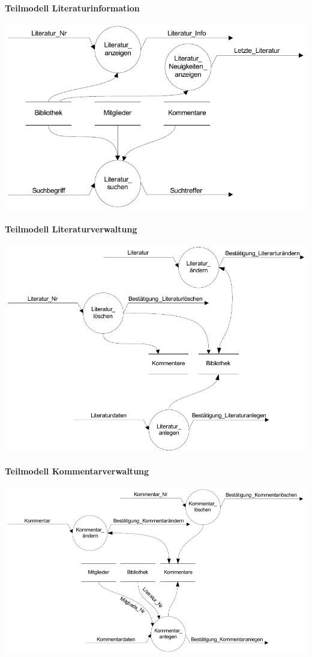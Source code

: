 \paragraph{Teilmodell Literaturinformation}
\includegraphics[scale=1.0]{teilmodell_literaturinformation}

\paragraph{Teilmodell Literaturverwaltung}
\includegraphics[scale=0.93]{teilmodell_bibliotheksverwaltung}

\paragraph{Teilmodell Kommentarverwaltung}
\includegraphics[scale=0.93]{teilmodell_kommentarverwaltung}

